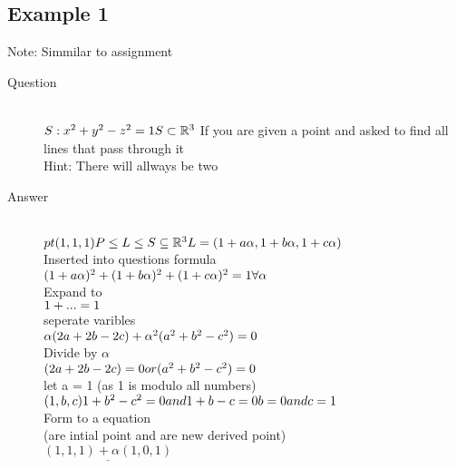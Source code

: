 \documentclass[11pt,twoside,a4paper]{article}
\begin{document}
    \subsection{Example 1}
      \label{Example_1_1}
      Note: Simmilar to assignment
      \begin{description}
        \item[Question] \hfill \\
          \(
            S:x^2+y^2-z^2=1 \\
            S\subset\mathbb{R}^3 \\
          \)
          If you are given a point and asked to find all lines that pass through it\\
          Hint: There will allways be two
        
        \item[Answer] \hfill \\
          \(
            pt(1,1,1) \\*
            P \leq L \leq S \subseteq \mathbb{R}^3 \\
            L = (1+a\alpha, 1+b\alpha, 1+c\alpha) \\
          \)
            \\ Inserted into questions formula \\
          \(
            (1+a\alpha)^2 + (1+b\alpha)^2 + (1+c\alpha)^2 = 1  \forall \alpha \\
          \)
            \\ Expand to\\
          \(
            1+ ... = 1 \\
          \)
            \\ seperate varibles \\
          \(
            \alpha(2a+2b-2c)+\alpha^2(a^2+b^2-c^2) = 0 \\
          \)
            \\ Divide by \(\alpha\) \\
          \(
            (2a+2b-2c) = 0 or (a^2+b^2-c^2) = 0 \\
          \)
            \\ let a = 1 (as 1 is modulo all numbers) \\
          \(
            (1,b,c) \\
            1+b^2-c^2 = 0 and 1+b-c=0 \\
            b=0 and c=1 \\
          \)
            \\ Form to a equation \\ (are intial point and are new derived point) \\
          \(
            \underline{(1,1,1) + \alpha(1,0,1)}
          \)
      \end{description}
  
\end{document}
